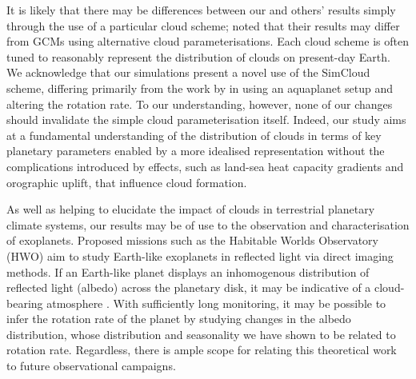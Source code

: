 It is likely that there may be differences between our and others' results simply through the use of a particular cloud scheme; \citet{komacek2019-Atmospheric} noted that their results may differ from GCMs using alternative cloud parameterisations. Each cloud scheme is often tuned to reasonably represent the distribution of clouds on present-day Earth. We acknowledge that our simulations present a novel use of the SimCloud scheme, differing primarily from the work by \citet{liu2021-SimCloud} in using an aquaplanet setup and altering the rotation rate. To our understanding, however, none of our changes should invalidate the simple cloud parameterisation itself. Indeed, our study aims at a fundamental understanding of the distribution of clouds in terms of key planetary parameters enabled by a more idealised representation without the complications introduced by effects, such as land-sea heat capacity gradients and orographic uplift, that influence cloud formation.

As well as helping to elucidate the impact of clouds in terrestrial planetary climate systems, our results may be of use to the observation and characterisation of exoplanets. Proposed missions such as the Habitable Worlds Observatory (HWO) aim to study Earth-like exoplanets in reflected light via direct imaging methods. If an Earth-like planet displays an inhomogenous distribution of reflected light (albedo) across the planetary disk, it may be indicative of a cloud-bearing atmosphere \citep{cowan2009-ALIEN, lustig-yaeger2018-Detecting}. With sufficiently long monitoring, it may be possible to infer the rotation rate of the planet by studying changes in the albedo distribution, whose distribution and seasonality we have shown to be related to rotation rate. Regardless, there is ample scope for relating this theoretical work to future observational campaigns.